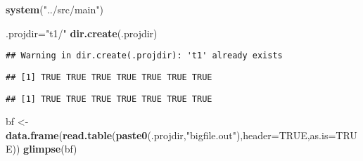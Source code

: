 \documentclass[]{article}
\newenvironment{Shaded}{\begin{snugshade}}{\end{snugshade}}
\newcommand{\DataTypeTok}[1]{\textcolor[rgb]{0.13,0.29,0.53}{#1}}
\newcommand{\KeywordTok}[1]{\textcolor[rgb]{0.13,0.29,0.53}{\textbf{#1}}}
\newcommand{\NormalTok}[1]{#1}
\newcommand{\OtherTok}[1]{\textcolor[rgb]{0.56,0.35,0.01}{#1}}
\newcommand{\StringTok}[1]{\textcolor[rgb]{0.31,0.60,0.02}{#1}}
\begin{document}
\begin{Shaded}
\begin{Highlighting}[]
\KeywordTok{system}\NormalTok{(}\StringTok{"../src/main"}\NormalTok{)}
\end{Highlighting}
\end{Shaded}

\begin{Shaded}
\begin{Highlighting}[]
\NormalTok{  .projdir=}\StringTok{"t1/"}
  \KeywordTok{dir.create}\NormalTok{(.projdir)}
\end{Highlighting}
\end{Shaded}

\begin{verbatim}
## Warning in dir.create(.projdir): 't1' already exists
\end{verbatim}

\begin{Shaded}
\end{Shaded}

\begin{verbatim}
## [1] TRUE TRUE TRUE TRUE TRUE TRUE TRUE
\end{verbatim}

\begin{Shaded}
\end{Shaded}

\begin{verbatim}
## [1] TRUE TRUE TRUE TRUE TRUE TRUE TRUE
\end{verbatim}

\begin{Shaded}
\begin{Highlighting}[]
\NormalTok{  bf \textless{}{-}}\StringTok{ }\KeywordTok{data.frame}\NormalTok{(}\KeywordTok{read.table}\NormalTok{(}\KeywordTok{paste0}\NormalTok{(.projdir,}\StringTok{"bigfile.out"}\NormalTok{),}\DataTypeTok{header=}\OtherTok{TRUE}\NormalTok{,}\DataTypeTok{as.is=}\OtherTok{TRUE}\NormalTok{))}
  \KeywordTok{glimpse}\NormalTok{(bf)}
\end{Highlighting}
\end{Shaded}
\end{document}
